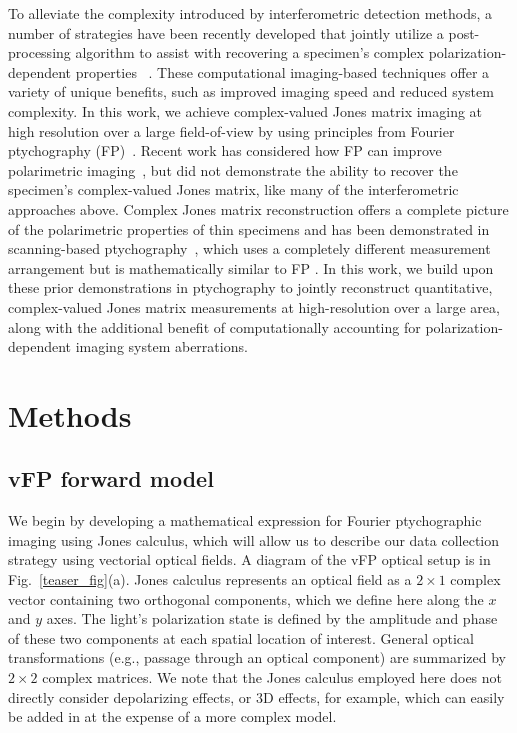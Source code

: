 \documentclass{article}
\begin{document}
To alleviate the complexity introduced by interferometric detection methods, a number of strategies have been recently developed that jointly utilize a post-processing algorithm to assist with recovering a specimen's complex polarization-dependent properties ~\cite{oldenbourg2013polarized,mehta2013polarized,shin2018reference,bai2020pathological,song2021large,song2020ptychography,yeh2021upti}. These computational imaging-based techniques offer a variety of unique benefits, such as improved imaging speed and reduced system complexity. In this work, we achieve complex-valued Jones matrix imaging at high resolution over a large field-of-view by using principles from Fourier ptychography (FP)~\cite{zheng2013wide}. Recent work has considered how FP can improve polarimetric imaging~\cite{song2021large}, but did not demonstrate the ability to recover the specimen's complex-valued Jones matrix, like many of the interferometric approaches above.  Complex Jones matrix reconstruction offers a complete picture of the polarimetric properties of thin specimens and has been demonstrated in scanning-based ptychography~\cite{ferrand2018quantitative,song2020ptychography}, which uses a completely different measurement arrangement but is mathematically similar to FP \cite{horstmeyer2014phase,konda2020fourier}. In this work, we build upon these prior demonstrations in ptychography to jointly reconstruct quantitative, complex-valued Jones matrix measurements at high-resolution over a large area, along with the additional benefit of computationally accounting for polarization-dependent imaging system aberrations.

\section{Methods}
\label{sec::method}

\subsection{vFP forward model}
\label{sec::forward model}

We begin by developing a mathematical expression for Fourier ptychographic imaging using Jones calculus, which will allow us to describe our data collection strategy using vectorial optical fields. A diagram of the vFP optical setup is in Fig.~\ref{teaser_fig}(a). Jones calculus represents an optical field as a $2\times1$ complex vector containing two orthogonal components, which we define here along the $x$ and $y$ axes. The light's polarization state is defined by the amplitude and phase of these two components at each spatial location of interest. General optical transformations (e.g., passage through an optical component) are summarized by $2\times2$ complex matrices. We note that the Jones calculus employed here does not directly consider depolarizing effects, or 3D effects, for example, which can easily be added in at the expense of a more complex model. 
\end{document}

